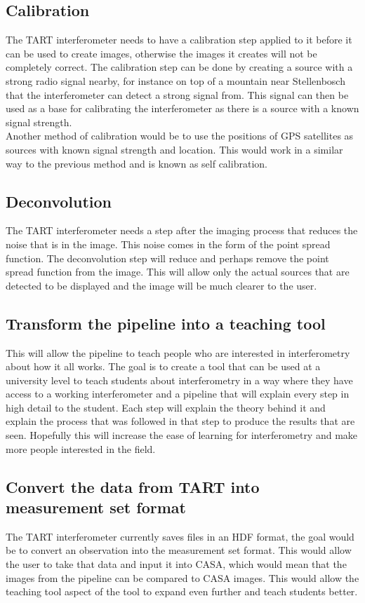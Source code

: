 \subsection{Calibration}
The TART interferometer needs to have a calibration step applied to it before it can be used to create images, otherwise the images it creates will not be completely correct. The calibration step can be done by creating a source with a strong radio signal nearby, for instance on top of a mountain near Stellenbosch that the interferometer can detect a strong signal from. This signal can then be used as a base for calibrating the interferometer as there is a source with a known signal strength.\\
Another method of calibration would be to use the positions of GPS satellites as sources with known signal strength and location\cite{CALIBRATION_TART}. This would work in a similar way to the previous method and is known as self calibration. 
\subsection{Deconvolution}
The TART interferometer needs a step after the imaging process that reduces the noise that is in the image. This noise comes in the form of the point spread function. The deconvolution step will reduce and perhaps remove the point spread function from the image. This will allow only the actual sources that are detected to be displayed and the image will be much clearer to the user.
\subsection{Transform the pipeline into a teaching tool}
This will allow the pipeline to teach people who are interested in interferometry about how it all works. 
The goal is to create a tool that can be used at a university level to teach students about interferometry in a way where they have access to a working interferometer and a pipeline that will explain every step in high detail to the student. Each step will explain the theory behind it and explain the process that was followed in that step to produce the results that are seen. Hopefully this will increase the ease of learning for interferometry and make more people interested in the field.
\subsection{Convert the data from TART into measurement set format}
The TART interferometer currently saves files in an HDF format, the goal would be to convert an observation into the measurement set format. This would allow the user to take that data and input it into CASA\cite{CASA}, which would mean that the images from the pipeline can be compared to CASA images. This would allow the teaching tool aspect of the tool to expand even further and teach students better. 